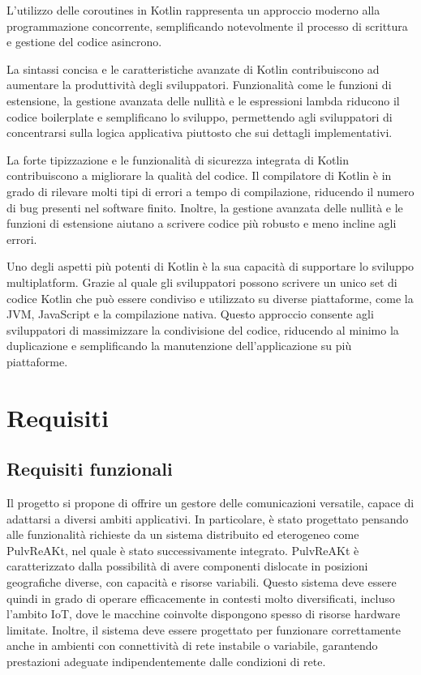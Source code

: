 \documentclass[12pt,a4paper,openright,twoside]{book}
\begin{document}
L'utilizzo delle coroutines in Kotlin rappresenta un approccio moderno alla programmazione concorrente, 
semplificando notevolmente il processo di scrittura e gestione del codice asincrono.

La sintassi concisa e le caratteristiche avanzate di Kotlin contribuiscono ad aumentare la produttività degli sviluppatori. 
Funzionalità come le funzioni di estensione, la gestione avanzata delle nullità e le espressioni lambda riducono il codice boilerplate e semplificano lo sviluppo, 
permettendo agli sviluppatori di concentrarsi sulla logica applicativa piuttosto che sui dettagli implementativi.

La forte tipizzazione e le funzionalità di sicurezza integrata di Kotlin contribuiscono a migliorare la qualità del codice. 
Il compilatore di Kotlin è in grado di rilevare molti tipi di errori a tempo di compilazione, riducendo il numero di bug presenti nel software finito. Inoltre, 
la gestione avanzata delle nullità e le funzioni di estensione aiutano a scrivere codice più robusto e meno incline agli errori.

Uno degli aspetti più potenti di Kotlin è la sua capacità di supportare lo sviluppo multiplatform. Grazie al quale gli sviluppatori possono scrivere 
un unico set di codice Kotlin che può essere condiviso e utilizzato su diverse piattaforme, come la \ac{JVM}, JavaScript e la compilazione nativa. 
Questo approccio consente agli sviluppatori di massimizzare la condivisione del codice, riducendo al minimo la duplicazione e semplificando la manutenzione dell'applicazione 
su più piattaforme.

\chapter{Requisiti}\label{chap:Requisiti}

\section{Requisiti funzionali}

Il progetto si propone di offrire un gestore delle comunicazioni versatile, capace di adattarsi a diversi ambiti applicativi. 
In particolare, è stato progettato pensando alle funzionalità richieste da un sistema distribuito ed eterogeneo come PulvReAKt, nel quale è stato successivamente integrato. 
PulvReAKt è caratterizzato dalla possibilità di avere componenti dislocate in posizioni geografiche diverse, con capacità e risorse variabili. 
Questo sistema deve essere quindi in grado di operare efficacemente in contesti molto diversificati, incluso l'ambito \ac{IoT}, dove le macchine coinvolte dispongono 
spesso di risorse hardware limitate. Inoltre, il sistema deve essere progettato per funzionare correttamente anche in ambienti con connettività di rete instabile o variabile, 
garantendo prestazioni adeguate indipendentemente dalle condizioni di rete.
\end{document}
